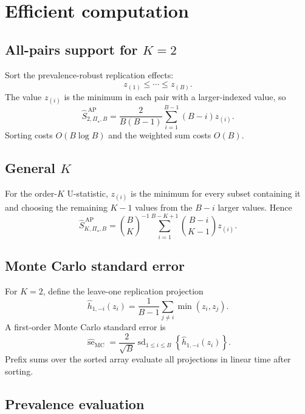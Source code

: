 \documentclass[11pt]{article}
\newcommand{\PSet}{\Pi_\star}
\theoremstyle{remark}
\begin{document}
\section{Efficient computation}
\label{app:computation}

\subsection{All-pairs support for $K=2$}

Sort the prevalence-robust replication effects:
\[
z_{(1)}\leq\cdots\leq z_{(B)}.
\]
The value $z_{(i)}$ is the minimum in each pair with a larger-indexed value, so
\begin{equation}
\widehat S_{2,\PSet,B}^{\,\mathrm{AP}}
=
\frac{2}{B(B-1)}
\sum_{i=1}^{B-1}
(B-i)z_{(i)}.
\label{eq:sorted-pairs}
\end{equation}
Sorting costs $O(B\log B)$ and the weighted sum costs $O(B)$.

\subsection{General $K$}

For the order-$K$ U-statistic, $z_{(i)}$ is the minimum for every subset containing it and choosing the remaining $K-1$ values from the $B-i$ larger values. Hence
\begin{equation}
\widehat S_{K,\PSet,B}^{\,\mathrm{AP}}
=
\binom{B}{K}^{-1}
\sum_{i=1}^{B-K+1}
\binom{B-i}{K-1}
z_{(i)}.
\label{eq:sorted-general-k}
\end{equation}

\subsection{Monte Carlo standard error}

For $K=2$, define the leave-one replication projection
\[
\widehat h_{1,-i}(z_i)
=
\frac{1}{B-1}
\sum_{j\ne i}
\min(z_i,z_j).
\]
A first-order Monte Carlo standard error is
\begin{equation}
\widehat{\operatorname{se}}_{\mathrm{MC}}
=
\frac{2}{\sqrt B}
\operatorname{sd}_{1\leq i\leq B}
\left\{
\widehat h_{1,-i}(z_i)
\right\}.
\label{eq:mcse}
\end{equation}
Prefix sums over the sorted array evaluate all projections in linear time after sorting.

\subsection{Prevalence evaluation}
\end{document}
